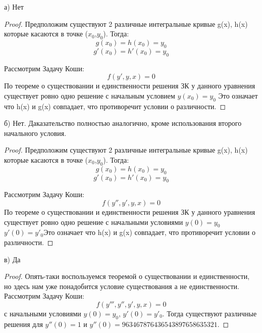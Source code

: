 \documentclass{article}
\begin{document}
а) Нет 
\begin{proof} Предположим существуют 2 различные интегральные кривые g(x), h(x) которые касаются в точке ($x_0$,$y_0$). Тогда:
\begin{equation}
g(x_0)=h(x_0)=y_0
\end{equation}
\begin{equation}
g'(x_0)=h'(x_0)=y_0  
\end{equation}

Рассмотрим Задачу Коши:
\begin{equation}
f(y',y,x)=0
\end{equation}
По теореме о существовании и единственности решения ЗК у данного уравнения существует ровно одно решение с начальным условием $y(x_0)=y_0$ Это означает что h(x) и g(x) совпадает, что противоречит условии о различности. 
\end{proof}
б) Нет. Даказательство полностью аналогично, кроме использования второго начального условия.  
\begin{proof} Предположим существуют 2 различные интегральные кривые g(x), h(x) которые касаются в точке ($x_0$,$y_0$). Тогда:
\begin{equation}
g(x_0)=h(x_0)=y_0
\end{equation}
\begin{equation}
g'(x_0)=h'(x_0)=y_0  
\end{equation}

Рассмотрим Задачу Коши:
\begin{equation}
f(y'',y',y,x)=0
\end{equation}
По теореме о существовании и единственности решения ЗК у данного уравнения существует ровно одно решение с начальными условиями $y(0)=y_0$ $y'(0)=y'_0$Это означает что h(x) и g(x) совпадает, что противоречит условии о различности. 
\end{proof}
в) Да
\begin{proof}
Опять-таки воспользуемся теоремой о существовании и единственности, но здесь нам уже понадобится условие существования а не единственности.
Рассмотрим Задачу Коши:
\begin{equation}
f(y''',y'',y',y,x)=0 
\end{equation}
с начальными условиями $y(0)=y_0$, $y'(0)=y'_0$. Тогда существуют различные решения для $y''(0)=1$ и $y''(0)=963467876436543897658635321$. 
\end{proof}
\end{document}

